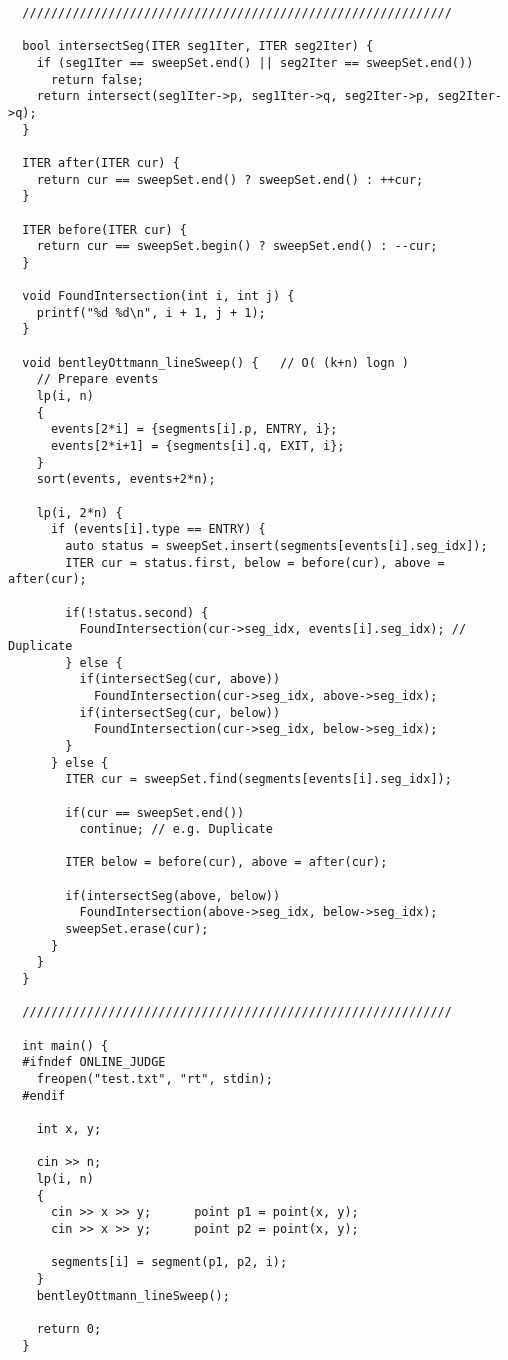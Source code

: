 \documentclass{article}
\begin{document}
\begin{verbatim}
  ////////////////////////////////////////////////////////////

  bool intersectSeg(ITER seg1Iter, ITER seg2Iter) {
    if (seg1Iter == sweepSet.end() || seg2Iter == sweepSet.end())
      return false;
    return intersect(seg1Iter->p, seg1Iter->q, seg2Iter->p, seg2Iter->q);
  }

  ITER after(ITER cur) {
    return cur == sweepSet.end() ? sweepSet.end() : ++cur;
  }

  ITER before(ITER cur) {
    return cur == sweepSet.begin() ? sweepSet.end() : --cur;
  }

  void FoundIntersection(int i, int j) {
    printf("%d %d\n", i + 1, j + 1);
  }

  void bentleyOttmann_lineSweep() {   // O( (k+n) logn )
    // Prepare events
    lp(i, n)
    {
      events[2*i] = {segments[i].p, ENTRY, i};
      events[2*i+1] = {segments[i].q, EXIT, i};
    }
    sort(events, events+2*n);

    lp(i, 2*n) {
      if (events[i].type == ENTRY) {
        auto status = sweepSet.insert(segments[events[i].seg_idx]);
        ITER cur = status.first, below = before(cur), above = after(cur);

        if(!status.second) {
          FoundIntersection(cur->seg_idx, events[i].seg_idx); // Duplicate
        } else {
          if(intersectSeg(cur, above))
            FoundIntersection(cur->seg_idx, above->seg_idx);
          if(intersectSeg(cur, below))
            FoundIntersection(cur->seg_idx, below->seg_idx);
        }
      } else {
        ITER cur = sweepSet.find(segments[events[i].seg_idx]);

        if(cur == sweepSet.end())
          continue; // e.g. Duplicate

        ITER below = before(cur), above = after(cur);

        if(intersectSeg(above, below))
          FoundIntersection(above->seg_idx, below->seg_idx);
        sweepSet.erase(cur);
      }
    }
  }

  ////////////////////////////////////////////////////////////

  int main() {
  #ifndef ONLINE_JUDGE
    freopen("test.txt", "rt", stdin);
  #endif

    int x, y;

    cin >> n;
    lp(i, n)
    {
      cin >> x >> y;      point p1 = point(x, y);
      cin >> x >> y;      point p2 = point(x, y);

      segments[i] = segment(p1, p2, i);
    }
    bentleyOttmann_lineSweep();

    return 0;
  }
\end{verbatim}
\end{document}
